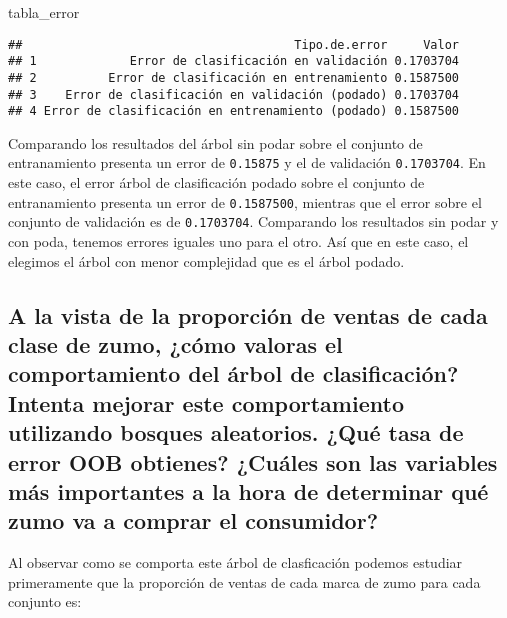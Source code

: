 \documentclass[
]{article}
\newenvironment{Shaded}{\begin{snugshade}}{\end{snugshade}}
\newcommand{\NormalTok}[1]{#1}
\begin{document}
\begin{Shaded}
\begin{Highlighting}[]
\NormalTok{tabla\_error}
\end{Highlighting}
\end{Shaded}

\begin{verbatim}
##                                      Tipo.de.error     Valor
## 1             Error de clasificación en validación 0.1703704
## 2          Error de clasificación en entrenamiento 0.1587500
## 3    Error de clasificación en validación (podado) 0.1703704
## 4 Error de clasificación en entrenamiento (podado) 0.1587500
\end{verbatim}

Comparando los resultados del árbol sin podar sobre el conjunto de
entranamiento presenta un error de \texttt{0.15875} y el de validación
\texttt{0.1703704}. En este caso, el error árbol de clasificación podado
sobre el conjunto de entranamiento presenta un error de
\texttt{0.1587500}, mientras que el error sobre el conjunto de
validación es de \texttt{0.1703704}. Comparando los resultados sin podar
y con poda, tenemos errores iguales uno para el otro. Así que en este
caso, el elegimos el árbol con menor complejidad que es el árbol podado.

\hypertarget{a-la-vista-de-la-proporciuxf3n-de-ventas-de-cada-clase-de-zumo-cuxf3mo-valoras-el-comportamiento-del-uxe1rbol-de-clasificaciuxf3n-intenta-mejorar-este-comportamiento-utilizando-bosques-aleatorios.-quuxe9-tasa-de-error-oob-obtienes-cuuxe1les-son-las-variables-muxe1s-importantes-a-la-hora-de-determinar-quuxe9-zumo-va-a-comprar-el-consumidor}{%
\subsection{A la vista de la proporción de ventas de cada clase de zumo,
¿cómo valoras el comportamiento del árbol de clasificación? Intenta
mejorar este comportamiento utilizando bosques aleatorios. ¿Qué tasa de
error OOB obtienes? ¿Cuáles son las variables más importantes a la hora
de determinar qué zumo va a comprar el
consumidor?}\label{a-la-vista-de-la-proporciuxf3n-de-ventas-de-cada-clase-de-zumo-cuxf3mo-valoras-el-comportamiento-del-uxe1rbol-de-clasificaciuxf3n-intenta-mejorar-este-comportamiento-utilizando-bosques-aleatorios.-quuxe9-tasa-de-error-oob-obtienes-cuuxe1les-son-las-variables-muxe1s-importantes-a-la-hora-de-determinar-quuxe9-zumo-va-a-comprar-el-consumidor}}

Al observar como se comporta este árbol de clasficación podemos estudiar
primeramente que la proporción de ventas de cada marca de zumo para cada
conjunto es:
\end{document}
